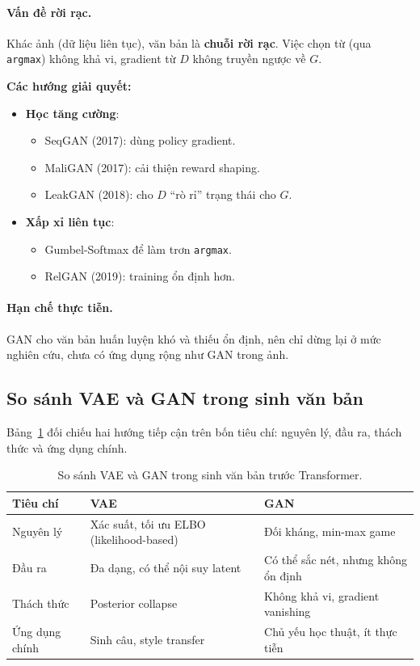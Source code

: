 \paragraph{Vấn đề rời rạc.}  
Khác ảnh (dữ liệu liên tục), văn bản là \textbf{chuỗi rời rạc}. Việc chọn từ (qua \texttt{argmax}) không khả vi, gradient từ $D$ không truyền ngược về $G$.  

\textbf{Các hướng giải quyết:}
\begin{itemize}
    \item \textbf{Học tăng cường}:
        \begin{itemize}
            \item SeqGAN (2017): dùng policy gradient.
            \item MaliGAN (2017): cải thiện reward shaping.
            \item LeakGAN (2018): cho $D$ “rò rỉ” trạng thái cho $G$.
        \end{itemize}
    \item \textbf{Xấp xỉ liên tục}:
        \begin{itemize}
            \item Gumbel-Softmax để làm trơn \texttt{argmax}.
            \item RelGAN (2019): training ổn định hơn.
        \end{itemize}
\end{itemize}

\paragraph{Hạn chế thực tiễn.}  
GAN cho văn bản huấn luyện khó và thiếu ổn định, nên chỉ dừng lại ở mức nghiên cứu, chưa có ứng dụng rộng như GAN trong ảnh.

\subsection{So sánh VAE và GAN trong sinh văn bản}
\label{ssec:vae_gan_compare}

Bảng~\ref{tab:vae_gan_compare} đối chiếu hai hướng tiếp cận trên bốn tiêu chí: nguyên lý, đầu ra, thách thức và ứng dụng chính.

\begin{table}[H]
\centering
\begin{tabular}{|p{3cm}|p{5cm}|p{5cm}|}
\hline
\textbf{Tiêu chí} & \textbf{VAE} & \textbf{GAN} \\ \hline
Nguyên lý & Xác suất, tối ưu ELBO (likelihood-based) & Đối kháng, min-max game \\ \hline
Đầu ra & Đa dạng, có thể nội suy latent & Có thể sắc nét, nhưng không ổn định \\ \hline
Thách thức & Posterior collapse & Không khả vi, gradient vanishing \\ \hline
Ứng dụng chính & Sinh câu, style transfer & Chủ yếu học thuật, ít thực tiễn \\ \hline
\end{tabular}
\caption{So sánh VAE và GAN trong sinh văn bản trước Transformer.}
\label{tab:vae_gan_compare}
\end{table}

